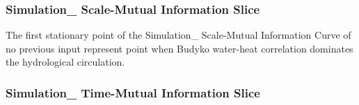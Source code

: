\documentclass{beamer}
\begin{document}
\begin{frame}
\frametitle{Simulation\_ Scale-Mutual Information Slice}
The first stationary point of the Simulation\_ Scale-Mutual Information Curve of no previous input represent point when Budyko water-heat correlation dominates the hydrological circulation.
\end{frame}

\begin{frame}
\frametitle{Simulation\_ Time-Mutual Information Slice}
 
\end{frame}
\end{document}
